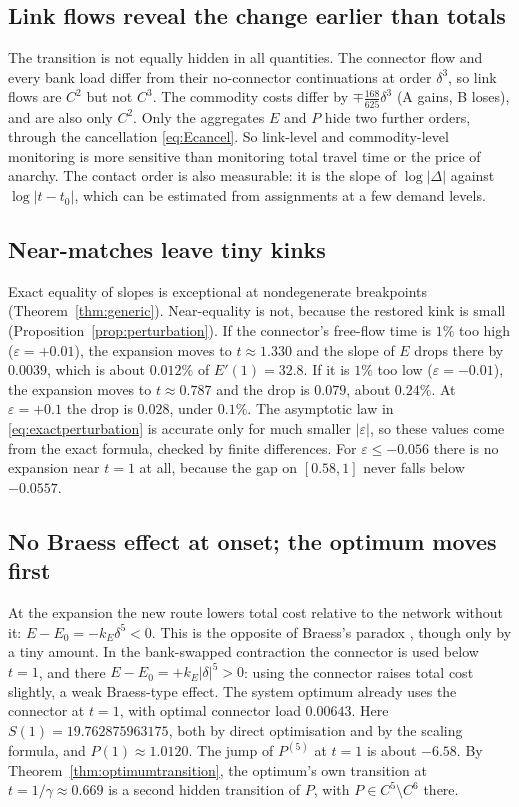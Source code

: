 \subsection{Link flows reveal the change earlier than totals}

The transition is not equally hidden in all quantities. The connector flow and every bank load differ from their no-connector continuations at order $\delta^3$, so link flows are $C^2$ but not $C^3$. The commodity costs differ by $\mp\frac{168}{625}\delta^3$ (A gains, B loses), and are also only $C^2$. Only the aggregates $E$ and $P$ hide two further orders, through the cancellation \eqref{eq:Ecancel}. So link-level and commodity-level monitoring is more sensitive than monitoring total travel time or the price of anarchy. The contact order is also measurable: it is the slope of $\log|\Delta|$ against $\log|t-t_0|$, which can be estimated from assignments at a few demand levels.

\subsection{Near-matches leave tiny kinks}

Exact equality of slopes is exceptional at nondegenerate breakpoints (Theorem~\ref{thm:generic}). Near-equality is not, because the restored kink is small (Proposition~\ref{prop:perturbation}). If the connector's free-flow time is $1\%$ too high ($\varepsilon=+0.01$), the expansion moves to $t\approx1.330$ and the slope of $E$ drops there by $0.0039$, which is about $0.012\%$ of $E'(1)=32.8$. If it is $1\%$ too low ($\varepsilon=-0.01$), the expansion moves to $t\approx0.787$ and the drop is $0.079$, about $0.24\%$. At $\varepsilon=+0.1$ the drop is $0.028$, under $0.1\%$. The asymptotic law in \eqref{eq:exactperturbation} is accurate only for much smaller $|\varepsilon|$, so these values come from the exact formula, checked by finite differences. For $\varepsilon\le-0.056$ there is no expansion near $t=1$ at all, because the gap on $[0.58,1]$ never falls below $-0.0557$. 

\subsection{No Braess effect at onset; the optimum moves first}

At the expansion the new route lowers total cost relative to the network without it: $E-E_0=-k_E\delta^5<0$. This is the opposite of Braess's paradox \cite{Braess1968,SteinbergZangwill1983}, though only by a tiny amount. In the bank-swapped contraction the connector is used below $t=1$, and there $E-E_0=+k_E|\delta|^5>0$: using the connector raises total cost slightly, a weak Braess-type effect. The system optimum already uses the connector at $t=1$, with optimal connector load $0.00643$. Here $S(1)=19.762875963175$, both by direct optimisation and by the scaling formula, and $P(1)\approx1.0120$. The jump of $P^{(5)}$ at $t=1$ is about $-6.58$. By Theorem~\ref{thm:optimumtransition}, the optimum's own transition at $t=1/\gamma\approx0.669$ is a second hidden transition of $P$, with $P\in C^5\setminus C^6$ there.

